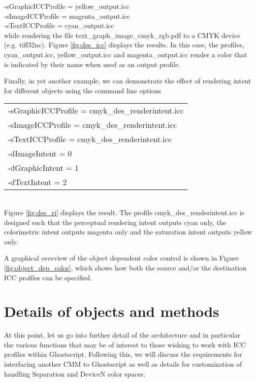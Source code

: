 \documentclass[12pt,notitlepage]{article}
\begin{document}
\noindent -sGraphicICCProfile = yellow\_output.icc\\
-sImageICCProfile = magenta\_output.icc\\
-sTextICCProfile = cyan\_output.icc\\

\noindent while rendering the file text\_graph\_image\_cmyk\_rgb.pdf to a CMYK device (e.g. tiff32nc).  Figure \ref{fig:des_icc} displays the results.  In this case, the profiles,
cyan\_output.icc, yellow\_output.icc and magenta\_output.icc render a color that is indicated by their name when used as an output profile.

Finally, in yet another example, we can demonstrate the effect of rendering intent for different objects using the command line options\\

\begin{tabular}{l}
-sGraphicICCProfile = cmyk\_des\_renderintent.icc\\
-sImageICCProfile = cmyk\_des\_renderintent.icc\\
 -sTextICCProfile = cmyk\_des\_renderintent.icc\\
-dImageIntent = 0\\
-dGraphicIntent = 1\\
-dTextIntent = 2\\
\end{tabular}\\

Figure \ref{fig:des_ri} displays the result.  The profile cmyk\_des\_renderintent.icc is designed such that the perceptual rendering intent outputs cyan only, the colorimetric intent outputs magenta only and the saturation intent outputs yellow only.

A graphical overview of the object dependent color control is shown in Figure \ref{fig:object_dep_color}, which shows how both the source and/or the destination ICC profiles can be specified.\\

\section{Details of objects and methods}

At this point, let us go into further detail of the architecture and in particular the various functions that may be of interest to those wishing to work with ICC profiles within Ghostscript.  Following this, we will discuss the requirements for interfacing another CMM to Ghostscript as well as details for customization of handling Separation and DeviceN color spaces.
\end{document}
